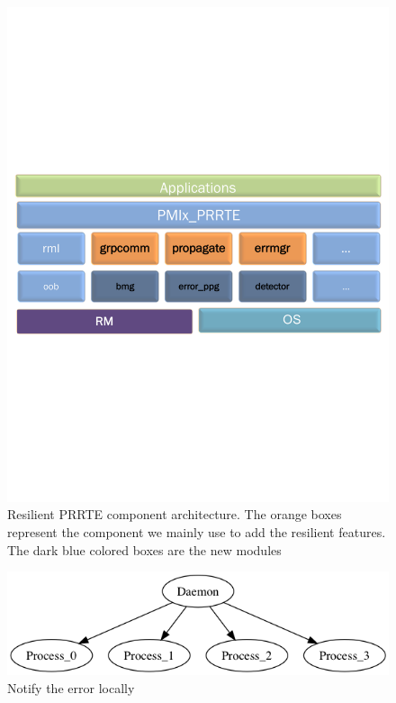 \documentclass[sigconf]{acmart}
\begin{document}
\begin{figure}[h]
  \centering
  \includegraphics[trim=0.2cm 9.0cm 0.2cm 9cm,width=\linewidth]{PMIx_PRRTE.pdf}
  \caption{Resilient PRRTE component architecture. The orange boxes represent the component we mainly use to add the resilient features. The dark blue colored boxes are the new modules}
\end{figure}

\begin{figure}[h]
  \centering
  \includegraphics[width=\linewidth]{test.png}
  \caption{Notify the error locally}
\end{figure}
\end{document}
